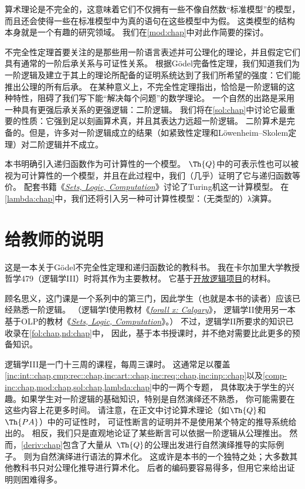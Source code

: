算术理论是不完全的，这意味着它们不仅拥有一些不像自然数“标准模型”的模型，而且还会使得一些在标准模型中为真的语句在这些模型中为假。
这类模型的结构本身就是一个有趣的研究领域。
我们在\cref{mod:chap}中对此作简要的探讨。

不完全性定理首要关注的是那些用一阶语言表述并可公理化的理论，并且假定它们具有通常的一阶后承关系与可证性关系。
根据Gödel完备性定理，我们知道我们为一阶逻辑及建立于其上的理论所配备的证明系统达到了我们所希望的强度：它们能推出公理的所有后承。
在某种意义上，不完全性定理指出，恰恰是一阶逻辑的这种特性，阻碍了我们写下能“解决每个问题”的数学理论。
一个自然的出路是采用一种具有更强后承关系的更强逻辑：二阶逻辑。
我们将在\cref{sol:chap}中讨论它最重要的性质：它强到足以刻画算术真，并且其表达力远超一阶逻辑。
二阶算术是完备的。但是，许多对一阶逻辑成立的结果（如紧致性定理和Löwenheim--Skolem定理）对二阶逻辑并不成立。

本书明确引入递归函数作为可计算性的一个模型。
$\Th{Q}$中的可表示性也可以被视为可计算性的一个模型，并且在此过程中，我们（几乎）证明了它与递归函数等价。
配套书籍《\href{https://slc.openlogicproject.org/}{\emph{Sets, Logic, Computation}}》讨论了Turing机这一计算模型。
在\cref{lambda:chap}中，我们还将引入另一种可计算性模型：（无类型的）λ演算。

\section*{给教师的说明}

这是一本关于Gödel不完全性定理和递归函数论的教科书。
我在卡尔加里大学教授哲学479（逻辑学III）时将其作为主要教材。
它基于\href{https://openlogicproject.org}{开放逻辑项目}的材料。

顾名思义，这门课是一个系列中的第三门，因此学生（也就是本书的读者）应该已经熟悉一阶逻辑。
（逻辑学I使用教材《\href{https://forallx.openlogicproject.org}{\emph{forall x: Calgary}}》，
逻辑学II使用另一本基于OLP的教材《\href{https://slc.openlogicproject.org}{\emph{Sets, Logic, Computation}}》。）
不过，逻辑学II所要求的知识已收录在\cref{fol:chap,nd:chap}中，
因此，基于本书授课时，并不绝对需要比此更多的预备知识。

逻辑学III是一门十三周的课程，每周三课时。
这通常足以覆盖\cref{inc:int::chap,cmp:rec::chap,inc:art::chap,inc:req::chap,inc:inp::chap}以及\cref{comp-inc:chap,mod:chap,sol:chap,lambda:chap}中的一两个专题，
具体取决于学生的兴趣。如果学生对一阶逻辑的基础知识，特别是自然演绎还不熟悉，
你可能需要在这些内容上花更多时间。
请注意，在正文中讨论算术理论（如$\Th{Q}$和$\Th{PA}$）中的可证性时，
可证性断言的证明并不是使用某个特定的推导系统给出的。
相反，我们只是直观地论证了某些断言可以依据一阶逻辑从公理推出。
然而，\cref{deriv:chap}包含了大量从~$\Th{Q}$的公理出发进行自然演绎推导的实际例子。
则为自然演绎进行语法的算术化。
这或许是本书的一个独特之处；大多数其他教科书只对公理化推导进行算术化。
后者的编码要容易得多，但用它来给出证明则困难得多。

